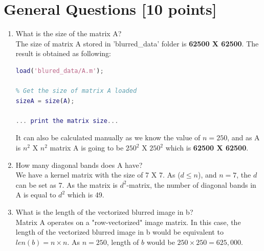 \documentclass[unicode,11pt,a4paper,oneside,numbers=endperiod,openany]{scrartcl}
\begin{document}
\setassignment
{}

\newline

\assignmentpolicy


\newpage

\section{General Questions [10 points]}

\begin{enumerate}
 \item What is the size of the matrix A? \\
 
 The size of matrix A stored in 'blurred\_data' folder is \textbf{62500 X 62500}. The result is obtained as following: \\
 
 \begin{lstlisting}[language=Matlab]
% Load the matrix struct
load('blured_data/A.m'); 

% Get the size of matrix A loaded
sizeA = size(A);

... print the matrix size...
 \end{lstlisting}
 
 It can also be calculated manually as we know the value of ${n = 250}$, and as A is ${n^2}$ X ${n^2}$ matrix A is going to be ${250^2}$ X ${250^2}$ which is \textbf{62500 X 62500}.
 
 \vspace{20px}
 
 \item How many diagonal bands does A have? \\
 
 We have a kernel matrix with the size of 7 X 7. As (${d \leq n}$), and ${n=7}$, the ${d}$ can be set as 7. As the matrix is ${d^2}$-matrix, the number of diagonal bands in A is equal to ${d^2}$ which is 49.
 
 \vspace{20px}
 
 \item What is the length of the vectorized blurred image in b? \\
 
 Matrix A operates on a "row-vectorized" image matrix. In this case, the length of the vectorized blurred image in b would be equivalent to ${len(b)=n\times n}$. As ${n = 250}$, length of ${b}$ would be ${250 \times 250 = 625,000}$.
\vspace{20px}
\end{enumerate}
\end{document}
